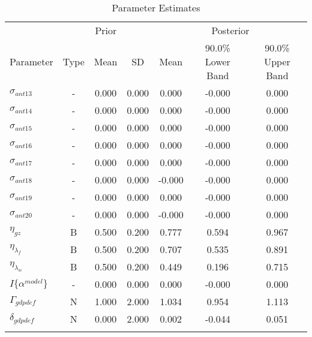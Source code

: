 \documentclass[12pt]{article}
\begin{document}
\pagestyle{empty}
\begin{table}[h]
\centering
\caption{Parameter Estimates}
\vspace*{.2cm}
{\small 
\begin{tabular}{lcccccc}
\hline
\multicolumn{1}{c}{} & \multicolumn{3}{c}{Prior} & \multicolumn{3}{c}{Posterior}\\ 
Parameter & Type & Mean & SD & Mean & 90.0\% {\tiny Lower Band} & 90.0\% {\tiny Upper Band}\\ 
\cmidrule(lr){1-1}\cmidrule(lr){2-4}\cmidrule(lr){5-7}
$\sigma_{ant13}$ & - &    0.000 &    0.000 &    0.000 &   -0.000 &    0.000 \\
$\sigma_{ant14}$ & - &    0.000 &    0.000 &    0.000 &   -0.000 &    0.000 \\
$\sigma_{ant15}$ & - &    0.000 &    0.000 &    0.000 &   -0.000 &    0.000 \\
$\sigma_{ant16}$ & - &    0.000 &    0.000 &    0.000 &   -0.000 &    0.000 \\
$\sigma_{ant17}$ & - &    0.000 &    0.000 &    0.000 &   -0.000 &    0.000 \\
$\sigma_{ant18}$ & - &    0.000 &    0.000 &   -0.000 &   -0.000 &    0.000 \\
$\sigma_{ant19}$ & - &    0.000 &    0.000 &    0.000 &   -0.000 &    0.000 \\
$\sigma_{ant20}$ & - &    0.000 &    0.000 &   -0.000 &   -0.000 &    0.000 \\
$\eta_{gz}$ & B &    0.500 &    0.200 &    0.777 &    0.594 &    0.967 \\
$\eta_{\lambda_f}$ & B &    0.500 &    0.200 &    0.707 &    0.535 &    0.891 \\
$\eta_{\lambda_w}$ & B &    0.500 &    0.200 &    0.449 &    0.196 &    0.715 \\
$I\{\alpha^{model}\}$ & - &    0.000 &    0.000 &    0.000 &   -0.000 &    0.000 \\
$\Gamma_{gdpdef}$ & N &    1.000 &    2.000 &    1.034 &    0.954 &    1.113 \\
$\delta_{gdpdef}$ & N &    0.000 &    2.000 &    0.002 &   -0.044 &    0.051 \\
\\ \hline
\end{tabular}}
\end{table}
\end{document}
